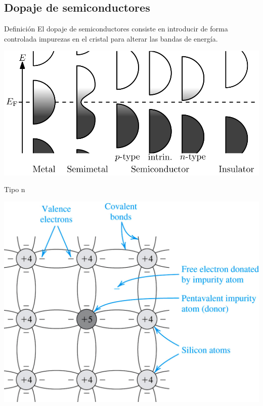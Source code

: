 \documentclass[xcolor={usenames,svgnames,dvipsnames}]{beamer}
\begin{document}
\subsection{Dopaje de semiconductores}
\label{sec:org618b9c8}
\begin{frame}[label={sec:org1be4ba7}]{Definición}
El \alert{dopaje de semiconductores} consiste en introducir de forma controlada impurezas en el cristal para alterar las bandas de energía.

\begin{center}
\includegraphics[width=.9\linewidth]{../figs/Band_filling_diagram.png}
\end{center}
\end{frame}


\begin{frame}[label={sec:org160dff1}]{Tipo n}
\begin{center}
\includegraphics[width=.9\linewidth]{../figs/DopajeN.jpg}
\end{center}
\end{frame}
\end{document}
